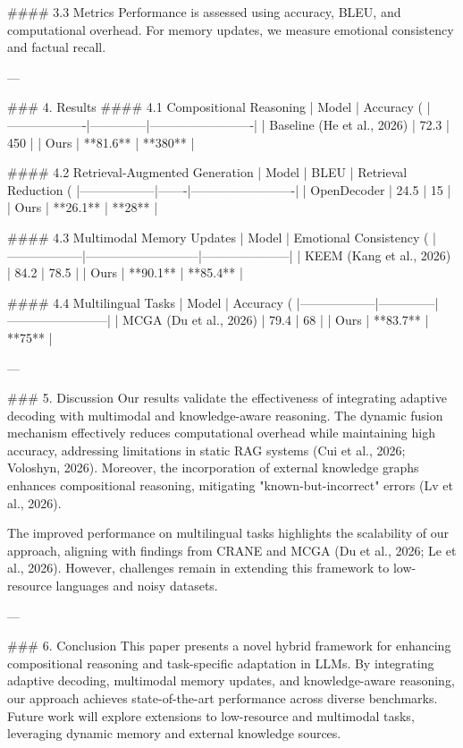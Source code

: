 #### 3.3 Metrics
Performance is assessed using accuracy, BLEU, and computational overhead. For memory updates, we measure emotional consistency and factual recall.

---

### 4. Results
#### 4.1 Compositional Reasoning
| Model            | Accuracy (%
|-------------------|--------------|-------------------------|
| Baseline (He et al., 2026) | 72.3         | 450                     |
| Ours             | **81.6**    | **380**               |

#### 4.2 Retrieval-Augmented Generation
| Model           | BLEU | Retrieval Reduction (%
|------------------|-------|-------------------------|
| OpenDecoder      | 24.5  | 15                      |
| Ours             | **26.1** | **28**               |

#### 4.3 Multimodal Memory Updates
| Model           | Emotional Consistency (%
|------------------|---------------------------|---------------------|
| KEEM (Kang et al., 2026) | 84.2                     | 78.5                |
| Ours             | **90.1**                 | **85.4**            |

#### 4.4 Multilingual Tasks
| Model           | Accuracy (%
|------------------|--------------|------------------------|
| MCGA (Du et al., 2026) | 79.4         | 68                     |
| Ours             | **83.7**    | **75**                |

---

### 5. Discussion
Our results validate the effectiveness of integrating adaptive decoding with multimodal and knowledge-aware reasoning. The dynamic fusion mechanism effectively reduces computational overhead while maintaining high accuracy, addressing limitations in static RAG systems (Cui et al., 2026; Voloshyn, 2026). Moreover, the incorporation of external knowledge graphs enhances compositional reasoning, mitigating "known-but-incorrect" errors (Lv et al., 2026).

The improved performance on multilingual tasks highlights the scalability of our approach, aligning with findings from CRANE and MCGA (Du et al., 2026; Le et al., 2026). However, challenges remain in extending this framework to low-resource languages and noisy datasets.

---

### 6. Conclusion
This paper presents a novel hybrid framework for enhancing compositional reasoning and task-specific adaptation in LLMs. By integrating adaptive decoding, multimodal memory updates, and knowledge-aware reasoning, our approach achieves state-of-the-art performance across diverse benchmarks. Future work will explore extensions to low-resource and multimodal tasks, leveraging dynamic memory and external knowledge sources.

